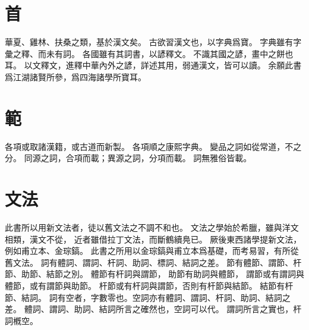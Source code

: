 \section{首}
華夏、雞林、扶桑之類，基於漢文矣。
古欲習漢文也，以字典爲寶。
字典雖有字彙之釋、而未有詞。
各國雖有其詞書，以諺釋文。
不識其國之諺，畫中之餅也耳。
以文釋文，進釋中華內外之諺，詳述其用，弱通漢文，皆可以讀。
余願此書爲江湖諸賢所參，爲四海諸學所寶耳。
\section{範}
各項或取諸漢籍，或古道而新製。
各項順之康熙字典。
變品之詞如從常道，不之分。
同源之詞，合項而載；異源之詞，分項而載。
詞無雅俗皆載。
\section{文法}
此書所以用新文法者，徒以舊文法之不調不和也。
文法之學始於希臘，雖與洋文相類，漢文不從，
近者雖借拉丁文法，而斷鶴續鳧已。
厥後東西諸學提新文法，例如甫立本、金琮鎬。
此書之所用以金琮鎬與甫立本爲基礎，而考易習，有所從舊文法。
詞有體詞、謂詞、杆詞、助詞、標詞、結詞之差。
節有體節、謂節、杆節、助節、結節之別。
體節有杆詞與謂節，
助節有助詞與體節，
謂節或有謂詞與體節，或有謂節與助節。
杆節或有杆詞與謂節，否則有杆節與結節。
結節有杆節、結詞。
詞有空者，字數零也。空詞亦有體詞、謂詞、杆詞、助詞、結詞之差。
體詞、謂詞、助詞、結詞所言之確然也，空詞可以代。
謂詞所言之實也，杆詞槪空。
